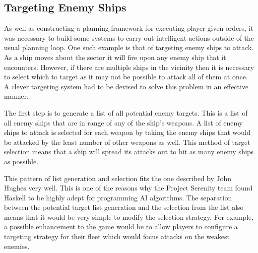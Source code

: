 \subsection{Targeting Enemy Ships}

As well as constructing a planning framework for executing player given orders,
it was necessary to build some systems to carry out intelligent actions outside
of the usual planning loop. One such example is that of targeting enemy ships to
attack. As a ship moves about the sector it will fire upon any enemy ship that
it encounters. However, if there are multiple ships in the vicinity then it is
necessary to select which to target as it may not be possible to attack all of
them at once. A clever targeting system had to be devised to solve this problem
in an effective manner.

The first step is to generate a list of all potential enemy targets. This is a list
of all enemy ships that are in range of any of the ship's weapons. A list of
enemy ships to attack is selected for each weapon by taking the enemy ships that
would be attacked by the least number of other weapons as well. This method of
target selection means that a ship will spread its attacks out to hit as many
enemy ships as possible.

This pattern of list generation and selection fits the one described by John Hughes
very well.\cite{hughes1989whyfp} This is one of the reasons why the Project Serenity
team found Haskell to be highly adept for programming AI algorithms. The separation
between the potential target list generation and the selection from the list also means
that it would be very simple to modify the selection strategy. For example, a
possible enhancement to the game would be to allow players to configure a targeting
strategy for their fleet which would focus attacks on the weakest enemies.

